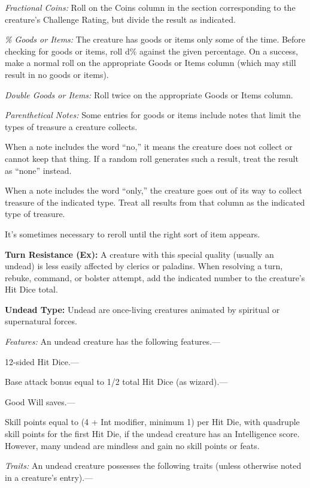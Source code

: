 \documentclass{article}
\begin{document}
\textit{Fractional Coins: }Roll on the Coins column in the section corresponding 
to the creature's Challenge Rating, but divide the result as indicated.

\textit{\% Goods or Items: }The creature has goods or items only some of the time. 
Before checking for goods or items, roll d\% against the given percentage. On a 
success, make a normal roll on the appropriate Goods or Items column (which may 
still result in no goods or items).

\textit{Double Goods or Items: }Roll twice on the appropriate Goods or Items column.

\textit{Parenthetical Notes: }Some entries for goods or items include notes that 
limit the types of treasure a creature collects.

When a note includes the word ``no,'' it means the creature does not collect or 
cannot keep that thing. If a random roll generates such a result, treat the result 
as ``none'' instead. 

When a note includes the word ``only,'' the creature goes out of its way to collect 
treasure of the indicated type. Treat all results from that column as the indicated 
type of treasure.

It's sometimes necessary to reroll until the right sort of item appears. 

\vspace{12pt}
\textbf{Turn Resistance (Ex): }A creature with this special quality (usually an 
undead) is less easily affected by clerics or paladins. When resolving a turn, 
rebuke, command, or bolster attempt, add the indicated number to the creature's 
Hit Dice total.

\vspace{12pt}
\textbf{Undead Type:} Undead are once-living creatures animated by spiritual or 
supernatural forces.

\textit{Features: }An undead creature has the following features.---

12-sided Hit Dice.---

Base attack bonus equal to 1/2 total Hit Dice (as wizard).---

Good Will saves.---

Skill points equal to (4 + Int modifier, minimum 1) per Hit Die, with quadruple 
skill points for the first Hit Die, if the undead creature has an Intelligence 
score. However, many undead are mindless and gain no skill points or feats.

\textit{Traits: }An undead creature possesses the following traits (unless otherwise 
noted in a creature's entry).---
\end{document}
